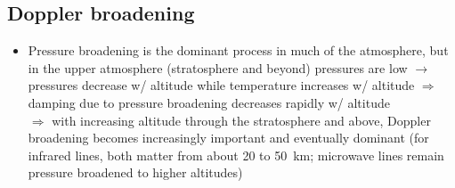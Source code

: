 \documentclass[11pt, oneside]{article}
\begin{document}
\subsection{Doppler broadening}
\label{s:doppler}

\begin{itemize}
	\item[--] Pressure broadening is the dominant process in much of the atmosphere, but in the upper atmosphere (stratosphere and beyond) pressures are low $\rightarrow$ pressures decrease w/ altitude while temperature increases w/ altitude $\Rightarrow$ damping due to pressure broadening decreases rapidly w/ altitude\\
	$\Rightarrow$ with increasing altitude through the stratosphere and above, Doppler broadening becomes increasingly important and eventually dominant (for infrared lines, both matter from about 20 to 50~km; microwave lines remain pressure broadened to higher altitudes)

\end{itemize}
\end{document}
